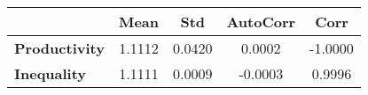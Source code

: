 \begin{tiny}\begin{tabular}{|l|c|c|c|c|}
\hline
&\textbf{Mean}&\textbf{Std}&\textbf{AutoCorr}&\textbf{Corr}\\\hline
\textbf{Productivity}&1.1112&0.0420&0.0002&-1.0000\\\hline
\textbf{Inequality}&1.1111&0.0009&-0.0003&0.9996\\\hline
\end{tabular}
\end{tiny}